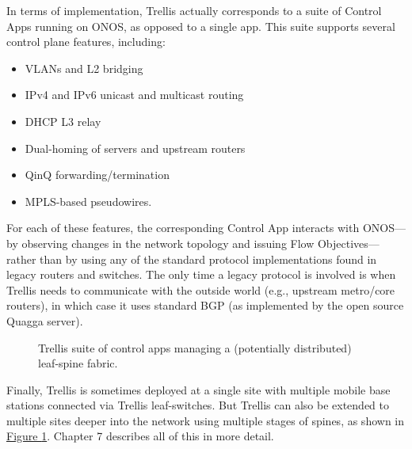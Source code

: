 \documentclass[letterpaper,11pt,english]{sphinxmanual}
\let\sphinxpxdimen\pdfpxdimen\else\newdimen\sphinxpxdimen
\begin{document}
In terms of implementation, Trellis actually corresponds to a suite of
Control Apps running on ONOS, as opposed to a single app. This suite
supports several control plane features, including:
\begin{itemize}
\item {} 
VLANs and L2 bridging

\item {} 
IPv4 and IPv6 unicast and multicast routing

\item {} 
DHCP L3 relay

\item {} 
Dual-homing of servers and upstream routers

\item {} 
QinQ forwarding/termination

\item {} 
MPLS-based pseudowires.

\end{itemize}

For each of these features, the corresponding Control App interacts
with ONOS—by observing changes in the network topology and issuing
Flow Objectives—rather than by using any of the standard protocol
implementations found in legacy routers and switches. The only time a
legacy protocol is involved is when Trellis needs to communicate with
the outside world (e.g., upstream metro/core routers), in which case
it uses standard BGP (as implemented by the open source Quagga
server).

\begin{figure}[htbp]
\centering
\capstart

\noindent\sphinxincludegraphics[width=600\sphinxpxdimen]{{Slide9}.png}
\caption{Trellis suite of control apps managing a (potentially distributed)
leaf-spine fabric.}\label{\detokenize{arch:id7}}\label{\detokenize{arch:fig-trellis}}\end{figure}

Finally, Trellis is sometimes deployed at a single site with multiple
mobile base stations connected via Trellis leaf-switches. But Trellis
can also be extended to multiple sites deeper into the network using
multiple stages of spines, as shown in \hyperref[\detokenize{arch:fig-trellis}]{Figure \ref{\detokenize{arch:fig-trellis}}}. Chapter 7 describes all of this in more detail.
\end{document}
